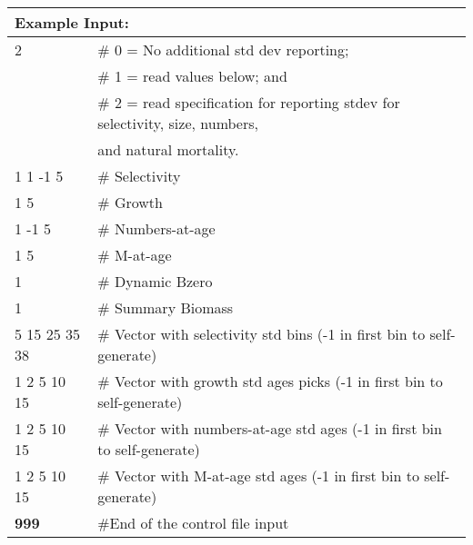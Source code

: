 \begin{longtable}{p{1.1cm} p{1.4cm} p{1.2cm} p{1.2cm} p{1.3cm} p{1.6cm} p{1.4cm} p{1.4cm} p{1.4cm}}
	
	\hline
	\multicolumn{9}{l}{Example Input:} \Tstrut\Bstrut\\
	\hline
	
	\multicolumn{3}{l}{2} & \multicolumn{6}{l}{\# 0 = No additional std dev reporting;} \Tstrut\\
	\multicolumn{3}{l}{ } & \multicolumn{6}{l}{\# 1 = read values below; and} \Bstrut\\
	\multicolumn{3}{l}{ } & \multicolumn{6}{l}{\# 2 = read specification for reporting stdev for selectivity, size, numbers,} \Bstrut\\
	\multicolumn{3}{l}{ } & \multicolumn{6}{l}{and natural mortality.} \Bstrut\\
	\hline
	
	\multicolumn{4}{l}{1 1 -1 5}  & \multicolumn{5}{l}{\# Selectivity} \Bstrut\\
	\multicolumn{4}{l}{1 5}       & \multicolumn{5}{l}{\# Growth} \Bstrut\\
	\multicolumn{4}{l}{1 -1 5}    & \multicolumn{5}{l}{\# Numbers-at-age} \Bstrut\\
	\multicolumn{4}{l}{1 5}       & \multicolumn{5}{l}{\# M-at-age} \Bstrut\\
	\multicolumn{4}{l}{1}         & \multicolumn{5}{l}{\# Dynamic Bzero} \Bstrut\\
	\multicolumn{4}{l}{1}         & \multicolumn{5}{l}{\# Summary Biomass} \Bstrut\\
	
	\multicolumn{4}{l}{5 15 25 35 38} & \multicolumn{5}{l}{\# Vector with selectivity std bins (-1 in first bin to self-generate)} \Bstrut\\
	\multicolumn{4}{l}{1 2 5 10 15}  & \multicolumn{5}{l}{\# Vector with growth std ages picks (-1 in first bin to self-generate)} \Bstrut\\
	\multicolumn{4}{l}{1 2 5 10 15}  & \multicolumn{5}{l}{\# Vector with numbers-at-age std ages (-1 in first bin to self-generate)} \Bstrut\\
	\multicolumn{4}{l}{1 2 5 10 15}  & \multicolumn{5}{l}{\# Vector with M-at-age std ages (-1 in first bin to self-generate)} \Bstrut\\
	
	\hline
	\bfseries{999} & \multicolumn{8}{l}{\#End of the control file input} \Tstrut\Bstrut\\
	\hline			
\end{longtable}

\pagebreak